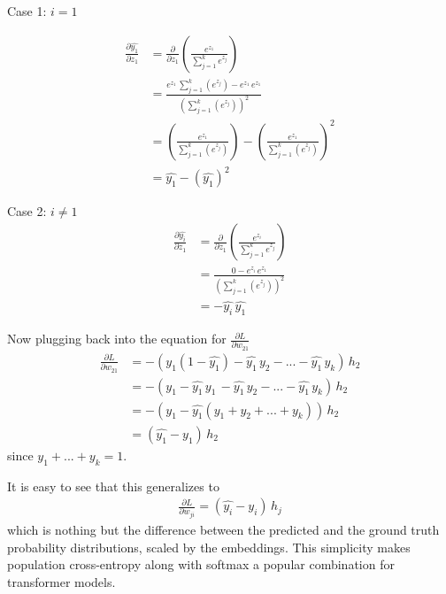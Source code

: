 \documentclass[fleqn, 12pt]{article}
\begin{document}
Case 1: $i = 1$

\begin{align}
    \frac{\partial \hat{y_1}}{\partial z_1} & = \frac{\partial}{\partial z_1} \left( \frac{e^{z_1}}{\sum_{j=1}^k e^{z_j}} \right) \\[10pt]
    & = \frac{e^{z_1} \, \sum_{j=1}^k (e^{z_j}) - e^{z_1} \, e^{z_1}}{(\sum_{j=1}^k (e^{z_j}))^2} \\[10pt]
    & = \left( \frac{e^{z_1}}{\sum_{j=1}^k (e^{z_j})}\right) - \left( \frac{e^{z_1}}{\sum_{j=1}^k (e^{z_j})}\right)^2\\[10pt]
    & = \hat{y_1} - (\hat{y_1})^2
\end{align}

Case 2: $i \neq 1$
\begin{align}
    \frac{\partial \hat{y_i}}{\partial z_1} & = \frac{\partial}{\partial z_1} \left( \frac{e^{z_i}}{\sum_{j=1}^k e^{z_j}} \right) \\[10pt]
    & = \frac{0 - e^{z_i} \, e^{z_1}}{(\sum_{j=1}^k (e^{z_j}))^2} \\[10pt]
    & = -\hat{y_i}\, \hat{y_1}
\end{align}

Now plugging back into the equation for $\frac{\partial L}{\partial w_{21}}$
\begin{align}
    \frac{\partial L}{\partial w_{21}} & = - ( y_1 (1-\hat{y_1}) - \hat{y_1} \, y_2 - ... - \hat{y_1} \, y_k ) \, h_2 \\[10pt]
    & = - \left( y_1 - \hat{y_1} \, y_1 \, - \hat{y_1} \, y_2 - ... - \hat{y_1} \, y_k \right) \, h_2\\[10pt]
    & = - (y_1 - \hat{y_1}( y_1 + y_2 + ... + y_k )) \, h_2 \\[10pt]
    & = (\hat{y_1} - y_1) \, h_2
\end{align}
since $y_1 + ... + y_k = 1$.

It is easy to see that this generalizes to
\begin{align}
    \frac{\partial L}{\partial w_{ji}} = (\hat{y_i} - y_i) \, h_j
\end{align}
which is nothing but the difference between the predicted and the ground truth probability distributions, scaled by the embeddings. This simplicity makes population cross-entropy along with softmax a popular combination for transformer models.
\end{document}
